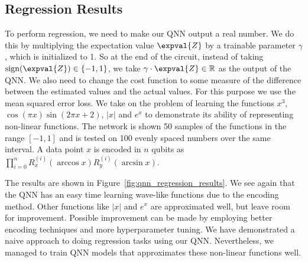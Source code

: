 \documentclass[a4paper,10pt]{article}
\DeclareMathOperator{\sign}{sign}
\begin{document}
\begin{appendices}
\section{Regression Results} \label{sec:qnn-regression}
To perform regression, we need to make our QNN output a real number.
We do this by multiplying the expectation value $\expval{Z}$ by a trainable parameter $\gamma$, which is initialized to 1.
So at the end of the circuit, instead of taking $\sign(\expval{Z}) \in \{-1, 1\}$, we take $\gamma \cdot \expval{Z} \in \mathbb{R}$ as the output of the QNN.
We also need to change the cost function to some measure of the difference between the estimated values and the actual values.
For this purpose we use the mean squared error loss.
We take on the problem of learning the functions $x^3$, $\cos(\pi x)\sin(2\pi x + 2)$, $|x|$ and $e^x$ to demonstrate its ability of representing non-linear functions.
The network is shown 50 samples of the functions in the range $[-1, 1]$ and is tested on 100 evenly spaced numbers over the same interval.
A data point $x$ is encoded in $n$ qubits as $\prod_{i=0}^{n}R_x^{(i)}(\arccos x)R_y^{(i)}(\arcsin x)$.

The results are shown in Figure~\ref{fig:qnn_regression_results}.
We see again that the QNN has an easy time learning wave-like functions due to the encoding method.
Other functions like $|x|$ and $e^x$ are approximated well, but leave room for improvement.
Possible improvement can be made by employing better encoding techniques and more hyperparameter tuning.
We have demonstrated a naive approach to doing regression tasks using our QNN.
Nevertheless, we managed to train QNN models that approximates these non-linear functions well.


\end{appendices}
\end{document}
